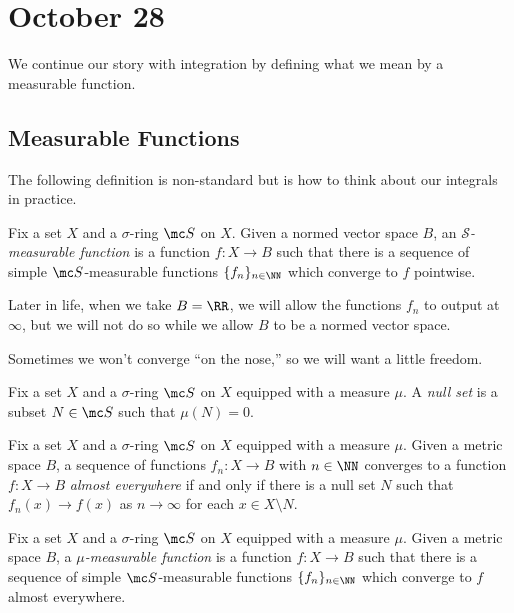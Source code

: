 \documentclass[../notes.tex]{subfiles}
\begin{document}
\section{October 28}

We continue our story with integration by defining what we mean by a measurable function.

\subsection{Measurable Functions}
The following definition is non-standard but is how to think about our integrals in practice.
\begin{definition}
	Fix a set $X$ and a $\sigma$-ring $\mc S$ on $X$. Given a normed vector space $B$, an \textit{$\mathcal S$-measurable function} is a function $f\colon X\to B$ such that there is a sequence of simple $\mc S$-measurable functions $\{f_n\}_{n\in\NN}$ which converge to $f$ pointwise.
\end{definition}
\begin{remark}
	Later in life, when we take $B=\RR$, we will allow the functions $f_n$ to output at $\infty$, but we will not do so while we allow $B$ to be a normed vector space.
\end{remark}
Sometimes we won't converge ``on the nose,'' so we will want a little freedom.
\begin{definition}
	Fix a set $X$ and a $\sigma$-ring $\mc S$ on $X$ equipped with a measure $\mu$. A \textit{null set} is a subset $N\in\mc S$ such that $\mu(N)=0$.
\end{definition}
\begin{definition}
	Fix a set $X$ and a $\sigma$-ring $\mc S$ on $X$ equipped with a measure $\mu$. Given a metric space $B$, a sequence of functions $f_n\colon X\to B$ with $n\in\NN$ converges to a function $f\colon X\to B$ \textit{almost everywhere} if and only if there is a null set $N$ such that $f_n(x)\to f(x)$ as $n\to\infty$ for each $x\in X\setminus N$.
\end{definition}
\begin{definition}
	Fix a set $X$ and a $\sigma$-ring $\mc S$ on $X$ equipped with a measure $\mu$. Given a metric space $B$, a \textit{$\mu$-measurable function} is a function $f\colon X\to B$ such that there is a sequence of simple $\mc S$-measurable functions $\{f_n\}_{n\in\NN}$ which converge to $f$ almost everywhere.
\end{definition}
\end{document}
